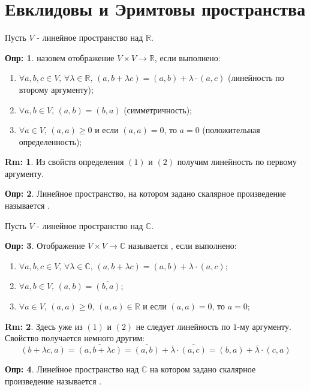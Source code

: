 \documentclass[12pt]{article}
\newcommand{\MR}{\mathbb{R}}
\newcommand{\MC}{\mathbb{C}}
\theoremstyle{definition}
\newtheorem{defn}{Опр:}
\newtheorem{rem}{Rm:}
\begin{document}
\section*{Евклидовы и Эримтовы пространства}
Пусть $V$ - линейное пространство над $\MR$.
\begin{defn}
	 назовем отображение $V\times V \to \MR$, если выполнено:
	\begin{enumerate}[label ={(\arabic*)}]
		\item $\forall a,b,c \in V, \, \forall \lambda \in \MR, \, (a,b + \lambda c) = (a,b) + \lambda{\cdot}(a,c)$ (линейность по второму аргументу);
		\item $\forall a,b \in V, \, (a,b) = (b,a)$ (симметричность);
		\item $\forall a \in V, \, (a,a) \geq 0$ и если $(a,a) = 0$, то $a = 0$ (положительная определенность);
	\end{enumerate}
\end{defn}
\begin{rem}
	Из свойств определения $(1)$ и $(2)$ получим линейность по первому аргументу.
\end{rem}

\begin{defn}
	Линейное пространство, на котором задано скалярное произведение называется .
\end{defn}
Пусть $V$ - линейное пространство над $\MC$.
\begin{defn}
	Отображение $V \times V \to \MC$ называется , если выполнено:
	\begin{enumerate}[label ={(\arabic*)}]
		\item $\forall a,b,c \in V, \, \forall \lambda \in \MC, \, (a,b + \lambda c) = (a,b) + \lambda{\cdot}(a,c)$;
		\item $\forall a,b \in V, \, (a,b) = \overline{(b,a)}$;
		\item $\forall a \in V, \, (a,a) \geq 0, \, (a,a) \in \MR$ и если $(a,a) = 0$, то $a = 0$;
	\end{enumerate}
\end{defn}
\begin{rem}
	Здесь уже из $(1)$ и $(2)$ не следует линейность по $1$-му аргументу. Свойство получается немного другим:
	$$
		(b + \lambda c,a) = \overline{(a, b+ \lambda c)} = \overline{(a,b)} + \overline{\lambda}{\cdot}\overline{(a,c)} = (b,a) + \overline{\lambda}{\cdot}(c,a)
	$$
\end{rem}
\begin{defn}
	Линейное пространство над $\MC$ на котором задано скалярное произведение называется .
\end{defn}
\end{document}
